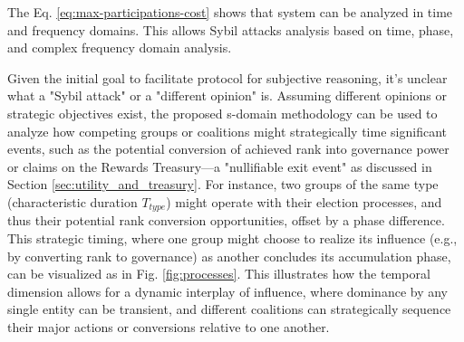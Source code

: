 \documentclass{article}
\begin{document}
\begin{CJK}{UTF8}{gbsn}
        The Eq. \ref{eq:max-participations-cost} shows that system can be analyzed in time and frequency domains. This allows Sybil attacks analysis based on time, phase, and complex frequency domain analysis.

        Given the initial goal to facilitate protocol for subjective reasoning, it's unclear what a "Sybil attack" or a "different opinion" is. Assuming different opinions or strategic objectives exist, the proposed s-domain methodology can be used to analyze how competing groups or coalitions might strategically time significant events, such as the potential conversion of achieved rank into governance power or claims on the Rewards Treasury—a "nullifiable exit event" as discussed in Section \ref{sec:utility_and_treasury}. For instance, two groups of the same type (characteristic duration $T_{type}$) might operate with their election processes, and thus their potential rank conversion opportunities, offset by a phase difference. This strategic timing, where one group might choose to realize its influence (e.g., by converting rank to governance) as another concludes its accumulation phase, can be visualized as in Fig. \ref{fig:processes}. This illustrates how the temporal dimension allows for a dynamic interplay of influence, where dominance by any single entity can be transient, and different coalitions can strategically sequence their major actions or conversions relative to one another.

        \begin{figure}[ht]
            \centering
\end{figure}
\end{CJK}
\end{document}
